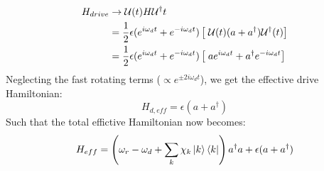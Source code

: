 \begin{align*}
    H_{drive} &\to \mathcal{U}(t) H_{} \mathcal{U}^\dagger{t} \\
    &= \frac12 \epsilon (e^{i\omega_d t} + e^{-i\omega_d t}) \left[ \; \mathcal{U}(t)  (a + a^\dagger) \mathcal{U}^\dagger(t)\right] \\
    &= \frac12 \epsilon (e^{i\omega_d t} + e^{-i\omega_d t}) \left[ \;a e^{i \omega_d t} + a^\dagger e^{-i \omega_d t} \right]
\end{align*}
Neglecting the fast rotating terms ($\propto e^{\pm 2i\omega_dt}$), we get the effective drive Hamiltonian:
\begin{equation}
    H_{d, eff} = \epsilon(a + a^\dagger)
\end{equation}
Such that the total effictive Hamiltonian now becomes:
\begin{equation}
    H_{eff} =  \left(\omega_r - \omega_d + \sum_k \chi_k \ket{k}\bra{k}\right)a^\dagger a + \epsilon(a + a^\dagger)
\end{equation}